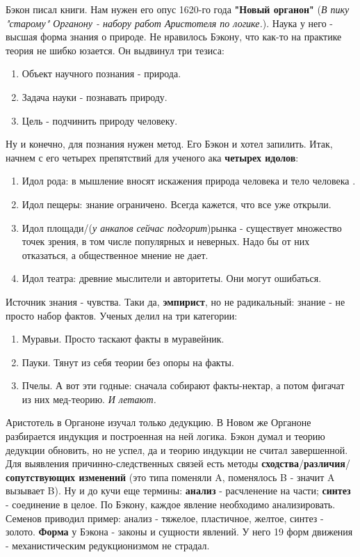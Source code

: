 Бэкон писал книги. Нам нужен его опус 1620-го года \textbf{"Новый органон"} (\textit{В пику "старому" Органону - набору работ Аристотеля по логике.}). Наука у него - высшая форма знания о природе.
Не нравилось Бэкону, что как-то на практике теория не шибко юзается.  Он выдвинул три тезиса:
\begin{enumerate}
\item Объект научного познания - природа.
\item Задача науки - познавать природу.
\item Цель - подчинить природу человеку.
\end{enumerate}
Ну и конечно, для познания нужен метод. Его Бэкон и хотел запилить. Итак, начнем с его четырех препятствий для ученого ака \textbf{четырех идолов}:
\begin{enumerate}
\item Идол рода: в мышление вносят искажения природа человека и тело человека . 
\item Идол пещеры: знание ограничено. Всегда кажется, что все уже открыли.
\item Идол площади/(\textit{у анкапов сейчас подгорит})рынка - существует множество точек зрения, в том числе популярных и неверных. Надо бы  от них отказаться, а общественное мнение не дает.
\item Идол театра: древние мыслители и авторитеты. Они могут ошибаться.
\end{enumerate}

Источник знания - чувства. Таки да, \textbf{эмпирист}, но не радикальный: знание - не просто набор фактов. Ученых делил на три категории:
\begin{enumerate}
\item Муравьи. Просто таскают факты в муравейник.
\item Пауки. Тянут из себя теории без опоры на факты.
\item Пчелы. А вот эти годные: сначала собирают факты-нектар, а потом фигачат из них мед-теорию. \textit{И летают.}
\end{enumerate}

Аристотель в Органоне изучал только дедукцию. В Новом же Органоне разбирается индукция и построенная на ней логика. Бэкон думал и теорию дедукции обновить, но не успел, да и теорию индукции не считал завершенной. Для выявления причинно-следственных связей есть методы \textbf{сходства}/\textbf{различия}/\textbf{сопутствующих изменений} (это типа поменяли A, поменялось B - значит A вызывает B). Ну и до кучи еще термины: \textbf{анализ} - расчленение на части; \textbf{синтез} - соединение в целое. По Бэкону, каждое явление необходимо анализировать. Семенов приводил пример: анализ - тяжелое, пластичное, желтое, синтез - золото. \textbf{Форма} у Бэкона - законы и сущности явлений. У него 19 форм движения - механистическим редукционизмом не страдал.

